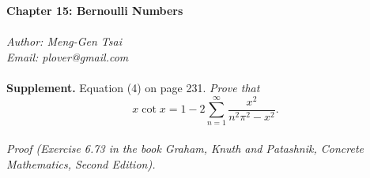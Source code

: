 \documentclass{article}
\begin{document}
\textbf{\Large Chapter 15: Bernoulli Numbers} \\\\



\emph{Author: Meng-Gen Tsai} \\
\emph{Email: plover@gmail.com} \\\\






\textbf{Supplement.} Equation (4) on page 231.
\emph{Prove that $$x \cot x = 1 - 2 \sum_{n=1}^{\infty} \frac{x^2}{n^2 \pi^2 - x^2}.$$} \\

\emph{Proof (Exercise 6.73 in the book Graham, Knuth and Patashnik,
Concrete Mathematics, Second Edition).}
\end{document}
